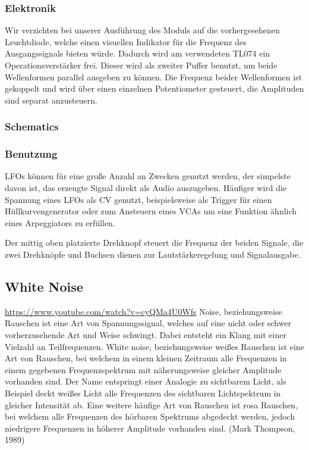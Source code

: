 \subsubsection{Elektronik}
\label{sec:orgae9eb5d}
Wir verzichten bei unserer Ausführung des Moduls auf die vorhergesehenen Leuchtdiode, welche einen visuellen Indikator für die Frequenz des Ausgangssignals bieten würde. Dadurch wird am verwendeten TL074 ein Operationsverstärker frei. Dieser wird als zweiter Puffer benutzt, um beide Wellenformen parallel ausgeben zu können. Die Frequenz beider Wellenformen ist gekoppelt und wird über einen einzelnen Potentiometer gesteuert, die Amplituden sind separat anzusteuern.

\subsubsection{Schematics}
\label{sec:org61e6ade}

\subsubsection{Benutzung}
\label{sec:org82df87a}
\acp{LFO} können für eine große Anzahl an Zwecken genutzt werden, der simpelste davon ist, das erzeugte Signal direkt als Audio auszugeben. Häufiger wird die Spannung eines LFOs als \acl{CV} genutzt, beispielsweise als Trigger für einen Hüllkurvengenerator oder zum Ansteuern eines \acp{VCA} um eine Funktion ähnlich eines Arpeggiators zu erfüllen.

Der mittig oben platzierte Drehknopf steuert die Frequenz der beiden Signale, die zwei Drehknöpfe und Buchsen dienen zur Lautstärkeregelung und Signalausgabe.

\subsection{White Noise}
\label{sec:orgcabfa98}
\url{https://www.youtube.com/watch?v=cyQMa4U0Wfs}
Noise, beziehungsweise Rauschen ist eine Art von Spannungssignal, welches auf eine nicht oder schwer vorherzusehende Art und Weise schwingt. Dabei entsteht ein Klang mit einer Vielzahl an Teilfrequenzen. White noise, beziehungsweise weißes Rauschen ist eine Art von Rauschen, bei welchem in einem kleinen Zeitraum alle Frequenzen in einem gegebenen Frequenzspektrum mit näherungsweise gleicher Amplitude vorhanden sind. Der Name entspringt einer Analogie zu sichtbarem Licht, als Beispiel deckt weißes Licht alle Frequenzen des sichtbaren Lichtspektrum in gleicher Intensität ab. Eine weitere häufige Art von Rauschen ist rosa Rauschen, bei welchem alle Frequenzen des hörbaren Spektrums abgedeckt werden, jedoch niedrigere Frequenzen in höherer Amplitude vorhanden sind.
(Mark Thompson, 1989)

